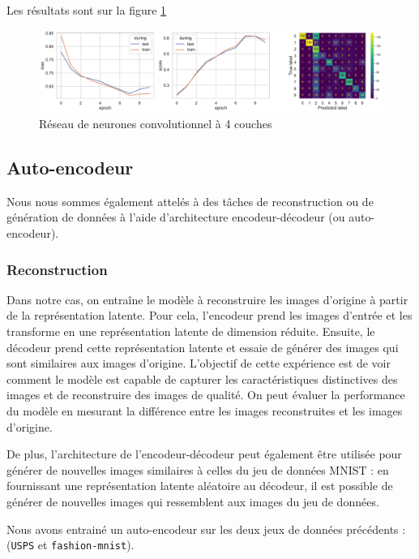 \documentclass{article}
\begin{document}
Les résultats sont sur la figure \ref*{fig:conv4layers}

\begin{figure}[htbp]
    \centering
    \includegraphics[width=\textwidth]{conv/conv_4layers.pdf}
    \caption{Réseau de neurones convolutionnel à 4 couches}
    \label{fig:conv4layers}
\end{figure}

\subsection{Auto-encodeur}

Nous nous sommes également attelés à des tâches de reconstruction ou de génération de données à l'aide d'architecture encodeur-décodeur (ou auto-encodeur). 

\subsubsection{Reconstruction}

Dans notre cas, on entraîne le modèle à reconstruire les images d'origine à partir de la représentation latente. Pour cela, l'encodeur prend les images d'entrée et les transforme en une représentation latente de dimension réduite. Ensuite, le décodeur prend cette représentation latente et essaie de générer des images qui sont similaires aux images d'origine. L'objectif de cette expérience est de voir comment le modèle est capable de capturer les caractéristiques distinctives des images et de reconstruire des images de qualité. On peut évaluer la performance du modèle en mesurant la différence entre les images reconstruites et les images d'origine.

De plus, l'architecture de l'encodeur-décodeur peut également être utilisée pour générer de nouvelles images similaires à celles du jeu de données MNIST : en fournissant une représentation latente aléatoire au décodeur, il est possible de générer de nouvelles images qui ressemblent aux images du jeu de données.

Nous avons entrainé un auto-encodeur sur les deux jeux de données précédents : (\texttt{USPS} et \texttt{fashion-mnist}). 
\end{document}
